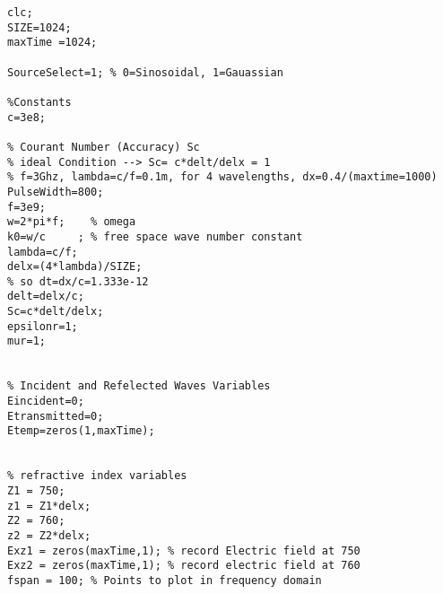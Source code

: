 \begin{lstlisting}
clc;
SIZE=1024;   
maxTime =1024;

SourceSelect=1; % 0=Sinosoidal, 1=Gauassian

%Constants
c=3e8;

% Courant Number (Accuracy) Sc
% ideal Condition --> Sc= c*delt/delx = 1
% f=3Ghz, lambda=c/f=0.1m, for 4 wavelengths, dx=0.4/(maxtime=1000)
PulseWidth=800;
f=3e9;
w=2*pi*f;    % omega
k0=w/c     ; % free space wave number constant
lambda=c/f;
delx=(4*lambda)/SIZE;
% so dt=dx/c=1.333e-12
delt=delx/c;
Sc=c*delt/delx;
epsilonr=1;
mur=1;


% Incident and Refelected Waves Variables
Eincident=0;
Etransmitted=0;
Etemp=zeros(1,maxTime);


% refractive index variables
Z1 = 750;
z1 = Z1*delx;
Z2 = 760;
z2 = Z2*delx;
Exz1 = zeros(maxTime,1); % record Electric field at 750
Exz2 = zeros(maxTime,1); % record electric field at 760
fspan = 100; % Points to plot in frequency domain


\end{lstlisting}
